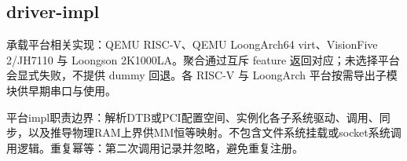 
\subsection{driver-impl}

承载平台相关实现：QEMU RISC-V、QEMU LoongArch64 virt、VisionFive 2/JH7110 与 Loongson 2K1000LA。聚合通过互斥 feature 返回对应；未选择平台会显式失败，不提供 dummy 回退。各 RISC-V 与 LoongArch 平台按需导出子模块供早期串口与使用。

平台impl职责边界：解析DTB或PCI配置空间、实例化各子系统驱动、调用、同步，以及推导物理RAM上界供MM恒等映射。不包含文件系统挂载或socket系统调用逻辑。重复幂等：第二次调用记录并忽略，避免重复注册。



